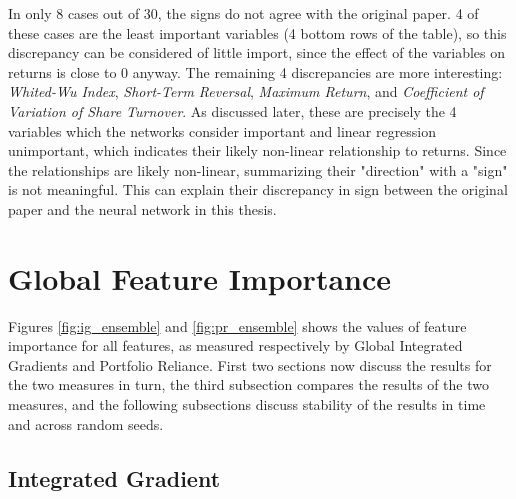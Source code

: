 	In only 8 cases out of 30, the signs do not agree with the original paper. 4 of these cases are the least important variables (4 bottom rows of the table), so this discrepancy can be considered of little import, since the effect of the variables on returns is close to 0 anyway. The remaining 4 discrepancies are more interesting: \textit{Whited-Wu Index}, \textit{Short-Term Reversal}, \textit{Maximum Return}, and \textit{Coefficient of Variation of Share Turnover}. As discussed later, these are precisely the 4 variables which the networks consider important and linear regression unimportant, which indicates their likely non-linear relationship to returns. Since the relationships are likely non-linear, summarizing their "direction" with a "sign" is not meaningful. This can explain their discrepancy in sign between the original paper and the neural network in this thesis. 
	
	
\section{Global Feature Importance}
	\label{chap:global_feature_importance}
	
	Figures \ref{fig:ig_ensemble} and \ref{fig:pr_ensemble} shows the values of feature importance for all features, as measured respectively by Global Integrated Gradients and Portfolio Reliance. First two sections now discuss the results for the two measures in turn, the third subsection compares the results of the two measures, and the following subsections discuss stability of the results in time and across random seeds. 
	
	\subsection{Integrated Gradient}
	
